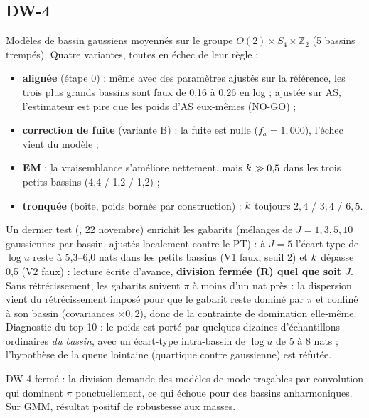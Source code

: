 \subsection{DW-4}
Modèles de bassin gaussiens moyennés sur le groupe $O(2)\times S_4\times\mathbb Z_2$ (5 bassins trempés). Quatre variantes, toutes en échec de leur règle :
\begin{itemize}
  \item \textbf{alignée} (étape 0) : même avec des paramètres ajustés sur la référence, les trois plus grands bassins sont faux de 0,16 à 0,26 en log ; ajustée sur AS, l'estimateur est pire que les poids d'AS eux-mêmes (NO-GO) ;
  \item \textbf{correction de fuite} (variante B) : la fuite est nulle ($f_a=1{,}000$), l'échec vient du modèle ;
  \item \textbf{EM} : la vraisemblance s'améliore nettement, mais $k\gg0{,}5$ dans les trois petits bassins (4,4 / 1,2 / 1,2) ;
  \item \textbf{tronquée} (boîte, poids bornés par construction) : $k$ toujours $2{,}4$ / $3{,}4$ / $6{,}5$.
\end{itemize}
Un dernier test (, 22 novembre) enrichit les gabarits (mélanges de $J=1,3,5,10$ gaussiennes par bassin, ajustés localement contre le PT) : à $J=5$ l'écart-type de $\log u$ reste à 5,3--6,0 nats dans les petits bassins (V1 faux, seuil 2) et $k$ dépasse 0,5 (V2 faux) : lecture écrite d'avance, \textbf{division fermée (R) quel que soit $J$}. Sans rétrécissement, les gabarits suivent $\pi$ à moins d'un nat près : la dispersion vient du rétrécissement imposé pour que le gabarit reste dominé par $\pi$ et confiné à son bassin (covariances $\times0{,}2$), donc de la contrainte de domination elle-même.
Diagnostic du top-10 : le poids est porté par quelques dizaines d'échantillons ordinaires \emph{du bassin}, avec un écart-type intra-bassin de $\log u$ de 5 à 8 nats ; l'hypothèse de la queue lointaine (quartique contre gaussienne) est réfutée.
\begin{verdict}DW-4 fermé : la division demande des modèles de mode traçables par convolution qui dominent $\pi$ ponctuellement, ce qui échoue pour des bassins anharmoniques. Sur GMM, résultat positif de robustesse aux masses.\end{verdict}
